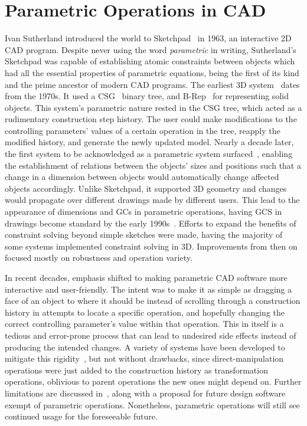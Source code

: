 \section{Parametric Operations in \acs{CAD}}%
\label{sec:intro.parametric}

Ivan Sutherland introduced the world to
Sketchpad~\cite{Sutherland:1964:Sketchpad} in 1963, an interactive 2D \ac{CAD}
program. Despite never using the word \textit{parametric} in writing,
Sutherland's Sketchpad was capable of establishing atomic constraints between
objects which had all the essential properties of parametric equations, being
the first of its kind and the prime ancestor of modern \ac{CAD} programs.  The
earliest 3D system~\cite{Requicha:1980:RRS:356827.356833} dates from the 1970s.
It used a \ac{CSG}~\cite{Requicha:1977:CSG,Foley:1996:CGPP} binary tree, and
\ac{B-Rep}~\cite{Stroud:2006:BRMT} for representing solid objects.  This
system's parametric nature rested in the \ac{CSG} tree, which acted as a
rudimentary construction step history.  The user could make modifications to the
controlling parameters' values of a certain operation in the tree, reapply the
modified history, and generate the newly updated model.  Nearly a decade later,
the first system to be acknowledged as a parametric system
surfaced~\cite{PTC:1980:ProENGINEER,Jabi:2013:PDA}, enabling the establishment
of relations between the objects' sizes and positions such that a change in a
dimension between objects would automatically change affected objects
accordingly.  Unlike Sketchpad, it supported 3D geometry and changes would
propagate over different drawings made by different users.  This lead to the
appearance of dimensions and \acp{GC} in parametric operations, having \ac{GCS}
in drawings become standard by the early
1990s~\cite{Chung:1990:TEVPD,Owen:1991:ASGDC,Bouma:1995:GCS}.  Efforts to expand
the benefits of constraint solving beyond simple sketches were made, having the
majority of some systems implemented constraint solving in 3D.  Improvements
from then on focused mostly on robustness and operation variety.

In recent decades, emphasis shifted to making parametric \ac{CAD} software more
interactive and user-friendly.  The intent was to make it as simple as dragging
a face of an object to where it should be instead of scrolling through a
construction history in attempts to locate a specific operation, and hopefully
changing the correct controlling parameter's value within that operation.  This
in itself is a tedious and error-prone process that can lead to undesired
side effects instead of producing the intended changes.  A variety of systems
have been developed to mitigate this
rigidity~\cite{Samuel:2006:CPPUP,Wu:2007:MSMSM,Clarke:2009:SM}, but not without
drawbacks, since direct-manipulation operations were just added to the
construction history as transformation operations, oblivious to parent
operations the new ones might depend on.  Further limitations are discussed
in~\cite{Bettig:2005:LPOSSD}, along with a proposal for future design software
exempt of parametric operations.  Nonetheless, parametric operations will still
see continued usage for the foreseeable future.
